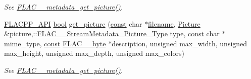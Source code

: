 \begin{DoxyCompactItemize}
\begin{DoxyCompactList}\small\item\em See \hyperlink{group__flac__metadata__level0_gaa13138ab038694909964998a113817b4}{F\+L\+A\+C\+\_\+\+\_\+metadata\+\_\+get\+\_\+picture()}. \end{DoxyCompactList}\item 
\hyperlink{group__flacpp__export_gaec3a801bf18630403eda6dc2f8c4927a}{F\+L\+A\+C\+P\+P\+\_\+\+A\+PI} \hyperlink{mac_2config_2i386_2lib-src_2libsoxr_2soxr-config_8h_abb452686968e48b67397da5f97445f5b}{bool} \hyperlink{group__flacpp__metadata__level0_gab99326ba601186b2893383f13cdd0f38}{get\+\_\+picture} (\hyperlink{getopt1_8c_a2c212835823e3c54a8ab6d95c652660e}{const} char $\ast$\hyperlink{test__portburn_8cpp_a7efa5e9c7494c7d4586359300221aa5d}{filename}, \hyperlink{class_f_l_a_c_1_1_metadata_1_1_picture}{Picture} \&picture,\+::\hyperlink{group__flac__format_gaf6d3e836cee023e0b8d897f1fdc9825d}{F\+L\+A\+C\+\_\+\+\_\+\+Stream\+Metadata\+\_\+\+Picture\+\_\+\+Type} type, \hyperlink{getopt1_8c_a2c212835823e3c54a8ab6d95c652660e}{const} char $\ast$mime\+\_\+type, \hyperlink{getopt1_8c_a2c212835823e3c54a8ab6d95c652660e}{const} \hyperlink{ordinals_8h_a5eb569b12d5b047cdacada4d57924ee3}{F\+L\+A\+C\+\_\+\+\_\+byte} $\ast$description, unsigned max\+\_\+width, unsigned max\+\_\+height, unsigned max\+\_\+depth, unsigned max\+\_\+colors)
\begin{DoxyCompactList}\small\item\em See \hyperlink{group__flac__metadata__level0_gaa13138ab038694909964998a113817b4}{F\+L\+A\+C\+\_\+\+\_\+metadata\+\_\+get\+\_\+picture()}. \end{DoxyCompactList}\end{DoxyCompactItemize}
